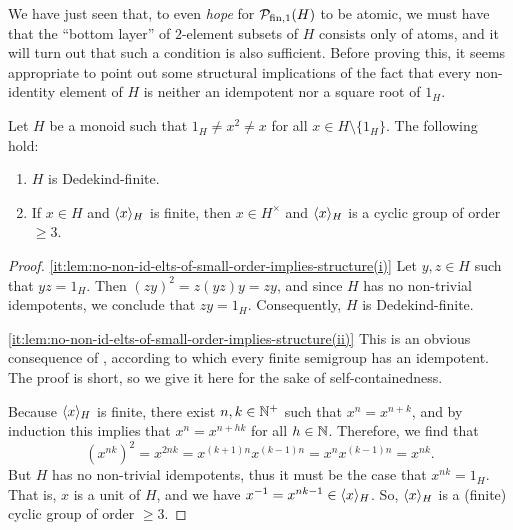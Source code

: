 %
We have just seen that, to even {\it hope} for $\mathcal{P}_{\textrm{fin}, 1}(H)$ to be atomic, we must have that the ``bottom layer'' of $2$-element subsets of $H$ consists only of atoms, and it will turn out that such a condition is also sufficient.
Before proving this, it seems appropriate to point out some structural implications of the fact that every non-identity element of $H$ is neither an idempotent nor a square root of $1_H$.
%
\begin{lemma}\label{lem:no-non-id-elts-of-small-order-implies-structure}
	Let $H$ be a monoid such that $1_H \ne x^2 \ne x$ for all $x\in H\setminus\{1_H\}$. The following hold:
	\begin{enumerate}[label={\rm (\roman{*})}]
		\item\label{it:lem:no-non-id-elts-of-small-order-implies-structure(i)}
		$H$ is Dedekind-finite.
		\item\label{it:lem:no-non-id-elts-of-small-order-implies-structure(ii)}
		If $x \in H$ and $\langle x \rangle_H$ is finite, then $x \in H^\times$ and $\langle x \rangle_H$ is a cyclic group of order $\ge 3$.
	\end{enumerate}
\end{lemma}
%
\begin{proof}
	\ref{it:lem:no-non-id-elts-of-small-order-implies-structure(i)}
	Let $y,z\in H$ such that $yz = 1_H$. Then $(zy)^2 = z(yz)y = zy$, and since $H$ has no non-trivial i\-dem\-po\-tents, we conclude that $zy=1_H$. Consequently, $H$ is Dedekind-finite.
	
	\ref{it:lem:no-non-id-elts-of-small-order-implies-structure(ii)}
	This is an obvious consequence of \cite[Ch. V, Exercise 4, p. 68]{Whitelaw}, according to which every finite semigroup has an idempotent.
	The proof is short, so we give it here for the sake of self-containedness.
	
	Because $\langle x \rangle_H$ is finite, there exist $n, k \in \mathbb{N}^+$ such that $x^n = x^{n+k}$, and by induction this implies that $x^n = x^{n+hk}$ for all $h \in \mathbb{N}$. Therefore, we find that
	\[
	(x^{nk})^2 = x^{2nk} = x^{(k+1)n}x^{(k-1)n} = x^n x^{(k-1)n} = x^{nk}.
	\]
	But $H$ has no non-trivial idempotents, thus it must be the case that $x^{nk}=1_H$. That is, $x$ is a unit of $H$, and we have $x^{-1} = x^{nk-1} \in \langle x \rangle_H$. So, $\langle x \rangle_H$ is a (finite) cyclic group of order $\ge 3$.
\end{proof}

%

